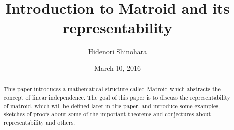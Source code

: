 \documentclass[psamsfonts]{amsart}
\title{Introduction to Matroid and its representability}
\author{Hidenori Shinohara}
\date{March 10, 2016}
\theoremstyle{definition}
\theoremstyle{remark}
\numberwithin{equation}{section}
\begin{document}
\begin{abstract}
This paper introduces a mathematical structure called Matroid which abstracts the concept of linear independence.
The goal of this paper is to discuss the representability of matroid, which will be defined later in this paper, and introduce some examples, sketches of proofs about some of the important theorems and conjectures about representability and others.

\end{abstract}

\maketitle

\tableofcontents










\end{document}
